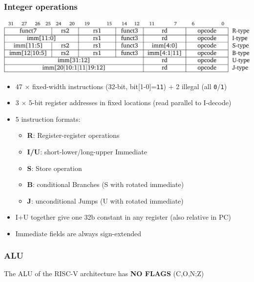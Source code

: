 \documentclass[
  10pt,
  a4paper,
]{article}
\providecommand{\tightlist}{%
  \setlength{\itemsep}{0pt}\setlength{\parskip}{0pt}}\usepackage{longtable,booktabs,array}
\begin{document}
\begin{multicols*}{2}
\subsubsection{Integer operations}\label{integer-operations}

\includegraphics{images/performance/image.png}

\begin{itemize}
\tightlist
\item
  47 \({\times}\) fixed-width instructions (32-bit,
  bit{[}1-0{]}=\texttt{11}) + 2 illegal (all \texttt{0}/\texttt{1})
\item
  3 \({\times}\) 5-bit register addresses in fixed locations (read
  parallel to I-decode)
\item
  5 instruction formats:

  \begin{itemize}
  \tightlist
  \item
    \textbf{R}: Register-register operations
  \item
    \textbf{I/U}: short-lower/long-upper Immediate
  \item
    \textbf{S}: Store operation
  \item
    \textbf{B}: conditional Branches (S with rotated immediate)
  \item
    \textbf{J}: unconditional Jumps (U with rotated immediate)
  \end{itemize}
\item
  I+U together give one 32b constant in any register (also relative in
  PC)
\item
  Immediate fields are always sign-extended
\end{itemize}

\subsubsection{ALU}\label{alu}

The ALU of the RISC-V architecture has \textbf{NO FLAGS} (C,O,N;Z)

\begin{tcolorbox}[enhanced jigsaw, coltitle=black, toprule=.15mm, colframe=quarto-callout-tip-color-frame, breakable, titlerule=0mm, title=\textcolor{quarto-callout-tip-color}{\faLightbulb}\hspace{0.5em}{64-Bit Zahl rechnen}, toptitle=1mm, colback=white, leftrule=.75mm, bottomtitle=1mm, colbacktitle=quarto-callout-tip-color!10!white, left=2mm, bottomrule=.15mm, rightrule=.15mm, arc=.35mm, opacityback=0, opacitybacktitle=0.6]


\end{tcolorbox}
\end{multicols*}
\end{document}

